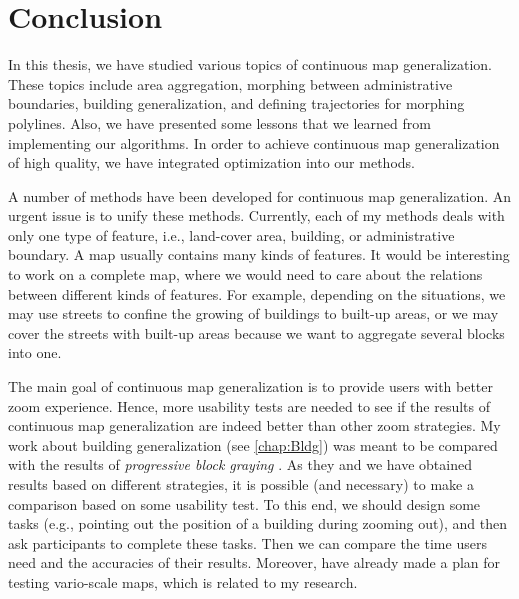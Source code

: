 \chapter{Conclusion}
\label{chap:Conclusion}

In this thesis, we have studied various topics of 
continuous map generalization.
These topics include area aggregation, 
morphing between administrative boundaries,
building generalization, and
defining trajectories for morphing polylines.
Also, we have presented some lessons that 
we learned from implementing our algorithms.
In order to achieve continuous map generalization 
of high quality, we have integrated optimization into our 
methods.

A number of methods have been developed for
continuous map generalization.
An urgent issue is to unify these methods.
Currently, each of my methods deals with only one type of 
feature, i.e., 
land-cover area, building, or administrative boundary.
A map usually contains many kinds of features.
It would be interesting to work on a complete map,
where we would need to care about the relations 
between different kinds of features.
For example, depending on the situations, 
we may use streets to confine the growing of 
buildings to built-up areas, or we may cover the 
streets with built-up areas 
because we want to aggregate several blocks into one.

The main goal of continuous map generalization is to provide 
users with better zoom experience.
Hence, more usability tests are needed to see if 
the results of continuous map generalization are indeed better 
than other zoom strategies.
My work about building generalization 
(see \chap\ref{chap:Bldg}) was meant 
to be compared with the results of 
\emph{progressive block graying} 
\parencite[see][]{Touya2017Progressive}.
As they and we have obtained results 
based on different strategies, 
it is possible (and necessary) to make a comparison 
based on some usability test.
To this end, we should design some tasks 
(e.g., pointing out the 
position of a building during zooming out), 
and then ask participants to complete these tasks.
Then we can compare the time users need 
and the accuracies of their results.
Moreover, \textcite{Suba2016Usability} 
have already made a plan for 
testing vario-scale maps, which is related to my research.


